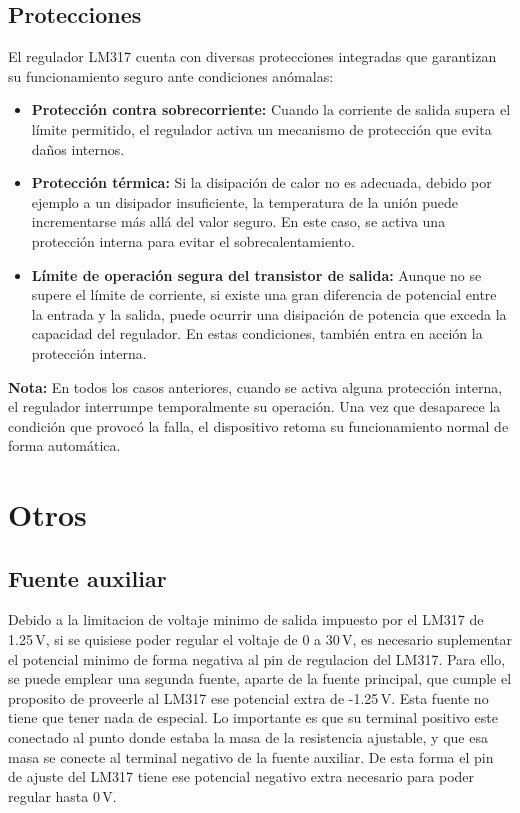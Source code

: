 \documentclass[chaptersright]{informeutn}
\begin{document}
        \subsection{Protecciones}
          El regulador LM317 cuenta con diversas protecciones integradas que garantizan su funcionamiento seguro ante
          condiciones anómalas:
          \begin{itemize}
              \item \textbf{Protección contra sobrecorriente:} Cuando la corriente de salida supera el límite
                permitido, el regulador activa un mecanismo de protección que evita daños internos.
              \item \textbf{Protección térmica:} Si la disipación de calor no es adecuada, debido por ejemplo a un
                disipador insuficiente, la temperatura de la unión puede incrementarse más allá del valor seguro. En
                este caso, se activa una protección interna para evitar el sobrecalentamiento.
              \item \textbf{Límite de operación segura del transistor de salida:} Aunque no se supere el límite de
                corriente, si existe una gran diferencia de potencial entre la entrada y la salida, puede ocurrir una
                disipación de potencia que exceda la capacidad del regulador. En estas condiciones, también entra en
                acción la protección interna.
          \end{itemize}

          \textbf{Nota:} En todos los casos anteriores, cuando se activa alguna protección interna, el regulador
            interrumpe temporalmente su operación. Una vez que desaparece la condición que provocó la falla, el
            dispositivo retoma su funcionamiento normal de forma automática.

      \section{Otros}
        \subsection{Fuente auxiliar}
          Debido a la limitacion de voltaje minimo de salida impuesto por el LM317 de 1.25\,V, si se quisiese poder
          regular el voltaje de 0 a 30\,V, es necesario suplementar el potencial minimo de forma negativa al pin de
          regulacion del LM317. Para ello, se puede emplear una segunda fuente, aparte de la fuente principal, que
          cumple el proposito de proveerle al LM317 ese potencial extra de -1.25\,V. Esta fuente no tiene que tener nada
          de especial. Lo importante es que su terminal positivo este conectado al punto donde estaba la masa de la
          resistencia ajustable, y que esa masa se conecte al terminal negativo de la fuente auxiliar. De esta forma
          el pin de ajuste del LM317 tiene ese potencial negativo extra necesario para poder regular hasta 0\,V.
\end{document}
